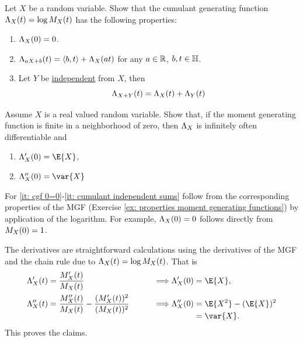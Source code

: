 
\begin{exercise}[subtitle={Properties of the cumulant generating function \Coffeecup}]
    \label{ex: properties cumulant generating function}
    Let \(X\) be a random variable. Show that the cumulant generating function
    \(\Lambda_X(t) = \log M_X(t)\) has the following properties:
    \begin{enumerate}[label=(\roman*), noitemsep]
        \item\label{it: cgf 0=0} \(\Lambda_X(0) = 0\).
        \item\label{it: cgf linear} \(\Lambda_{aX + b}(t) = \langle b, t\rangle + \Lambda_X(a t)\) for any \(a \in \mathbb{R}\), \(b,t\in \mathbb{H}\).
        \item\label{it: cumulant independent sums} Let \(Y\) be \underline{independent} from \(X\), then
        \[
            \Lambda_{X+Y}(t) = \Lambda_X(t) + \Lambda_Y(t)
        \]
    \end{enumerate}
    Assume \(X\) is a real valued random variable. Show that, if the moment generating
    function is finite in a neighborhood of zero, then \(\Lambda_X\) is infinitely
    often differentiable and
    \begin{enumerate}[label=(\roman*), resume, noitemsep]
        \item \(\CGF_X'(0) = \E{X}\),
        \item \(\CGF_X''(0) = \var{X}\)
    \end{enumerate}
\end{exercise}

\begin{solution}
    For \ref{it: cgf 0=0}-\ref{it: cumulant independent sums} follow from the
    corresponding properties of the MGF (Exercise \ref{ex: properties moment
    generating functions}) by application of the logarithm.  For example,
    \(\Lambda_X(0)=0\) follows directly from \(M_X(0)=1\).

    The derivatives are straightforward calculations using the derivatives of the MGF
    and the chain rule due to \(\Lambda_X(t) = \log M_X(t)\). That is
    \begin{alignat*}{3}
        \CGF_X'(t)
        &= \frac{\MGF_X'(t)}{\MGF_X(t)}
        \qquad &\implies &\CGF_X'(0) = \E{X},
        \\
        \CGF_X''(t)
        &= \frac{\MGF_X''(t)}{\MGF_X(t)} - \frac{(\MGF_X'(t))^2}{(\MGF_X(t))^2}
        \qquad &\implies &\CGF_X''(0)
        \begin{aligned}[t]
        &= \E{X^2} - (\E{X})^2
        \\
        &= \var{X}.
        \end{aligned}
    \end{alignat*}
    This proves the claims.
\end{solution}
